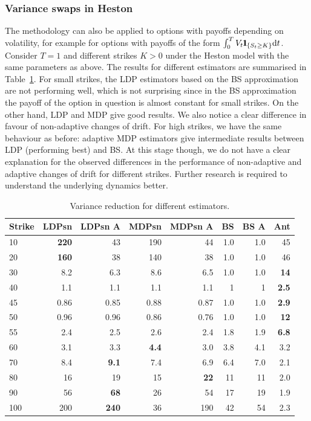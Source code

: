 \subsubsection{Variance swaps in Heston}
The methodology can also be applied to options with payoffs depending on volatility,
for example for options with payoffs of the form
$\int_0^T V_t \ind_{\{S_t\geq K\}}\D t$.
Consider $T = 1$ and different strikes $K>0$ under the Heston model with the same parameters as above. The results for different estimators are summarised in Table~\ref{tab:VarSwap}.
For small strikes, the LDP estimators based on the BS approximation are not performing well, which is not surprising since in the BS approximation the payoff of the option in question is almost constant for small strikes. On the other hand, LDP and MDP give good results. We also notice a clear difference in favour of non-adaptive changes of drift.
For high strikes, we have the same behaviour as before: adaptive MDP estimators give intermediate results between LDP (performing best) and BS. At this stage though, we do not have a clear explanation for the observed differences in the performance of non-adaptive and adaptive changes of drift for different strikes. Further research is required to understand the underlying dynamics better.
\small{
\begin{table}[H]
\centering
\begin{tabular}{lrrrrrrr}
\toprule
Strike &  LDPsn &  LDPsn A &  MDPsn &  MDPsn A &  BS &  BS A &  Ant \\
\midrule
10  &    \textbf{220} &       43 &    190 &       44 & 1.0 &   1.0 &   45 \\
20  &    \textbf{160} &       38 &    140 &       38 & 1.0 &   1.0 &   46 \\
30  &    8.2 &      6.3 &    8.6 &      6.5 & 1.0 &   1.0 &   \textbf{14} \\
40  &    1.1 &      1.1 &    1.1 &      1.1 &   1 &     1 &  \textbf{2.5} \\
45  &   0.86 &     0.85 &   0.88 &     0.87 & 1.0 &   1.0 &  \textbf{2.9} \\
50  &   0.96 &     0.96 &   0.86 &     0.76 & 1.0 &   1.0 &   \textbf{12} \\
55  &    2.4 &      2.5 &    2.6 &      2.4 & 1.8 &   1.9 &  \textbf{6.8} \\
60  &    3.1 &      3.3 &    \textbf{4.4} &      3.0 & 3.8 &   4.1 &  3.2 \\
70  &    8.4 &  \textbf{9.1} &    7.4 &      6.9 & 6.4 &   7.0 &  2.1 \\
80  &     16 &  19 &     15 &       \textbf{22} &  11 &    11 &  2.0 \\
90  &     56 &  \textbf{68} &     26 &       54 &  17 &    19 &  1.9 \\
100 &    200 &      \textbf{240} &     36 &      190 &  42 &    54 &  2.3 \\
\bottomrule
\end{tabular}
\caption{Variance reduction for different estimators.}\label{tab:VarSwap}
\end{table}
}
